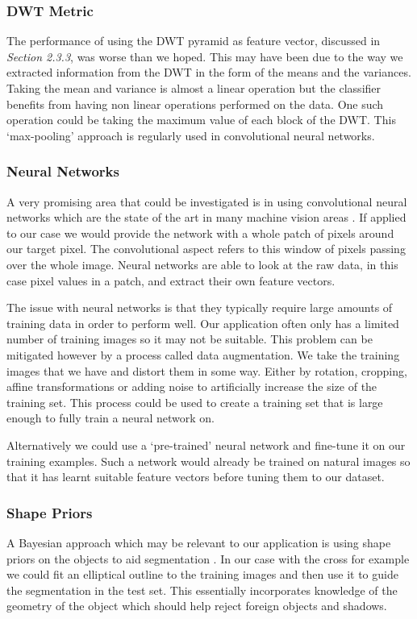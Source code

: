 \documentclass[12pt]{IIBproject}
\begin{document}
\subsubsection{DWT Metric}
The performance of using the DWT pyramid as feature vector, discussed in \emph{Section 2.3.3}, was worse than we hoped. This may have been due to the way we extracted information from the DWT in the form of the means and the variances. Taking the mean and variance is almost a linear operation but the classifier benefits from having non linear operations performed on the data. One such operation could be taking the maximum value of each block of the DWT. This `max-pooling' approach is regularly used in convolutional neural networks.
\subsubsection{Neural Networks}
A very promising area that could be investigated is in using convolutional neural networks which are the state of the art in many machine vision areas \cite{imageNet}. If applied to our case we would provide the network with a whole patch of pixels around our target pixel. The convolutional aspect refers to this window of pixels passing over the whole image. Neural networks are able to look at the raw data, in this case pixel values in a patch, and extract their own feature vectors. 

The issue with neural networks is that they typically require large amounts of training data in order to perform well. Our application often only has a limited number of training images so it may not be suitable. This problem can be mitigated however by a process called data augmentation. We take the training images that we have and distort them in some way. Either by rotation, cropping, affine transformations or adding noise to artificially increase the size of the training set. This process could be used to create a training set that is large enough to fully train a neural network on.

 Alternatively we could use a `pre-trained' neural network \cite{matconv} and fine-tune it on our training examples. Such a network would already be trained on natural images so that it has learnt suitable feature vectors before tuning them to our dataset.
\subsubsection{Shape Priors}
A Bayesian approach which may be relevant to our application is using shape priors on the objects to aid segmentation \cite{chang2008bayesian}. In our case with the cross for example we could fit an elliptical outline to the training images and then use it to guide the segmentation in the test set. This essentially incorporates knowledge of the geometry of the object which should help reject foreign objects and shadows. 
\end{document}
